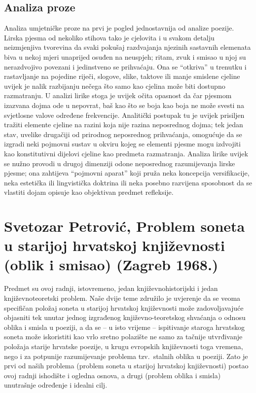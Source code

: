 \documentclass[a4paper,12pt,twoside]{report}
\begin{document}
\section*{Analiza proze}

Analiza umjetničke proze na prvi je pogled jednostavnija od analize poezije. Lirska pjesma od nekoliko stihova tako je cjelovita i u svakom detalju neizmjenjiva tvorevina da svaki pokušaj razdvajanja njezinih sastavnih elemenata biva u nekoj mjeri unaprijed osuđen na neuspjeh; ritam, zvuk i smisao u njoj su nerazdvojivo povezani i jedinstveno se prihvaćaju. Ona se ``otkriva'' u trenutku i rastavljanje na pojedine riječi, slogove, slike, taktove ili manje smislene cjeline uvijek je nalik razbijanju nečega što samo kao cjelina može biti dostupno razmatranju. U analizi lirike stoga je uvijek očita opasnost da čar pjesmom izazvana dojma ode u nepovrat, baš kao što se boja kao boja ne može svesti na svjetlosne valove određene frekvencije. Analitički postupak tu je uvijek prisiljen tražiti elemente cjeline na razini koja nije razina neposrednog dojma; tek jedan stav, uvelike drugačiji od prirodnog neposrednog prihvaćanja, omogućuje da se izgradi neki pojmovni sustav u okviru kojeg se elementi pjesme mogu izdvojiti kao konstitutivni dijelovi cjeline kao predmeta razmatranja. Analiza lirike uvijek se nužno provodi u drugoj dimenziji odone neposrednog razumijevanja lirske pjesme; ona zahtijeva ``pojmovni aparat'' koji pruža neka koncepcija versifikacije, neka estetička ili lingvistička doktrina ili neka posebno razvijena sposobnost da se vlastiti dojam opisuje kao objektivan predmet refleksije.

\chapter[Svetozar Petrović, Problem soneta]{Svetozar Petrović, Problem soneta u starijoj hrvatskoj književnosti (oblik i smisao) (Zagreb 1968.)}

Predmet su ovoj radnji, istovremeno, jedan književnohistorijski i jedan književnoteoretski problem. Naše dvije teme združilo je uvjerenje da se veoma specifičan položaj soneta u starijoj hrvatskoj književnosti može zadovoljavajuće objasniti tek unutar jednog izgrađenog književno-teoretskog shvaćanja o odnosu oblika i smisla u poeziji, a da se – u isto vrijeme – ispitivanje staroga hrvatskog soneta može iskoristiti kao vrlo sretno polazište ne samo za tačnije utvrđivanje položaja starije hrvat­ske poezije, u krugu evropskih književnosti toga vremena, nego i za pot­punije razumijevanje problema tzv.\ stalnih oblika u poeziji. Zato je prvi od naših problema (problem soneta u starijoj hrvatskoj književno­sti) postao ovoj radnji ishodište i ogledna osnova, a drugi (problem ob­lika i smisla) unutrašnje određenje i idealni cilj.
\end{document}
